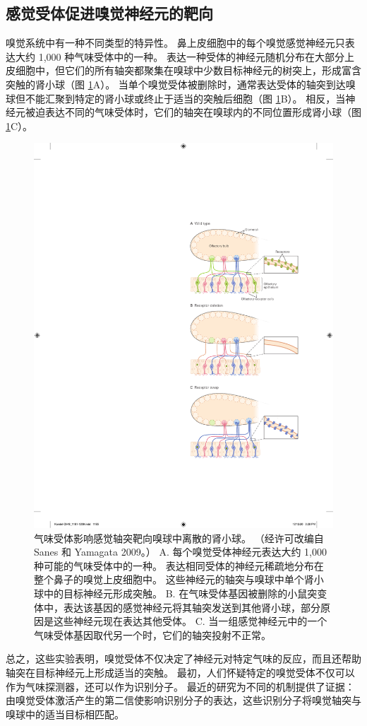 \subsection{感觉受体促进嗅觉神经元的靶向}
嗅觉系统中有一种不同类型的特异性。 鼻上皮细胞中的每个嗅觉感觉神经元只表达大约 1,000 种气味受体中的一种。 
表达一种受体的神经元随机分布在大部分上皮细胞中，但它们的所有轴突都聚集在嗅球中少数目标神经元的树突上，形成富含突触的肾小球（图 \ref{fig:48_3}A）。 
当单个嗅觉受体被删除时，通常表达受体的轴突到达嗅球但不能汇聚到特定的肾小球或终止于适当的突触后细胞（图 \ref{fig:48_3}B）。 相反，当神经元被迫表达不同的气味受体时，它们的轴突在嗅球内的不同位置形成肾小球（图 \ref{fig:48_3}C）。

\begin{figure}[htbp]
	\centering
	\includegraphics[width=0.5\linewidth]{chap48/fig_48_3}
	\caption{气味受体影响感觉轴突靶向嗅球中离散的肾小球。 （经许可改编自 Sanes 和 Yamagata 2009。） A. 每个嗅觉受体神经元表达大约 1,000 种可能的气味受体中的一种。 表达相同受体的神经元稀疏地分布在整个鼻子的嗅觉上皮细胞中。 这些神经元的轴突与嗅球中单个肾小球中的目标神经元形成突触。 B. 在气味受体基因被删除的小鼠突变体中，表达该基因的感觉神经元将其轴突发送到其他肾小球，部分原因是这些神经元现在表达其他受体。 C. 当一组感觉神经元中的一个气味受体基因取代另一个时，它们的轴突投射不正常。}
	\label{fig:48_3}
\end{figure}

总之，这些实验表明，嗅觉受体不仅决定了神经元对特定气味的反应，而且还帮助轴突在目标神经元上形成适当的突触。 最初，人们怀疑特定的嗅觉受体不仅可以作为气味探测器，还可以作为识别分子。 最近的研究为不同的机制提供了证据：由嗅觉受体激活产生的第二信使影响识别分子的表达，这些识别分子将嗅觉轴突与嗅球中的适当目标相匹配。


